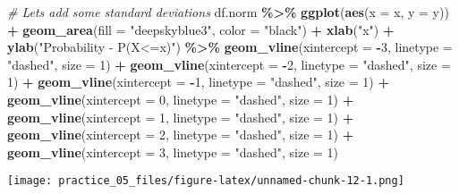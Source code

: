 \documentclass[
]{article}
\newenvironment{Shaded}{\begin{snugshade}}{\end{snugshade}}
\newcommand{\AttributeTok}[1]{\textcolor[rgb]{0.13,0.29,0.53}{#1}}
\newcommand{\CommentTok}[1]{\textcolor[rgb]{0.56,0.35,0.01}{\textit{#1}}}
\newcommand{\DecValTok}[1]{\textcolor[rgb]{0.00,0.00,0.81}{#1}}
\newcommand{\FunctionTok}[1]{\textcolor[rgb]{0.13,0.29,0.53}{\textbf{#1}}}
\newcommand{\NormalTok}[1]{#1}
\newcommand{\SpecialCharTok}[1]{\textcolor[rgb]{0.81,0.36,0.00}{\textbf{#1}}}
\newcommand{\StringTok}[1]{\textcolor[rgb]{0.31,0.60,0.02}{#1}}
\begin{document}
\begin{Shaded}
\begin{Highlighting}[]
\CommentTok{\# Let\textquotesingle{}s add some standard deviations}
\NormalTok{df.norm }\SpecialCharTok{\%\textgreater{}\%} 
  \FunctionTok{ggplot}\NormalTok{(}\FunctionTok{aes}\NormalTok{(}\AttributeTok{x =}\NormalTok{ x,}
             \AttributeTok{y =}\NormalTok{ y)) }\SpecialCharTok{+}
  \FunctionTok{geom\_area}\NormalTok{(}\AttributeTok{fill =} \StringTok{"deepskyblue3"}\NormalTok{, }
            \AttributeTok{color =} \StringTok{"black"}\NormalTok{) }\SpecialCharTok{+}
  \FunctionTok{xlab}\NormalTok{(}\StringTok{"x"}\NormalTok{) }\SpecialCharTok{+}
  \FunctionTok{ylab}\NormalTok{(}\StringTok{"Probability   {-}   P(X\textless{}=x)"}\NormalTok{) }\SpecialCharTok{\%\textgreater{}\%} 
  \FunctionTok{geom\_vline}\NormalTok{(}\AttributeTok{xintercept =} \SpecialCharTok{{-}}\DecValTok{3}\NormalTok{, }\AttributeTok{linetype =} \StringTok{"dashed"}\NormalTok{, }\AttributeTok{size =} \DecValTok{1}\NormalTok{) }\SpecialCharTok{+}
  \FunctionTok{geom\_vline}\NormalTok{(}\AttributeTok{xintercept =} \SpecialCharTok{{-}}\DecValTok{2}\NormalTok{, }\AttributeTok{linetype =} \StringTok{"dashed"}\NormalTok{, }\AttributeTok{size =} \DecValTok{1}\NormalTok{) }\SpecialCharTok{+}
  \FunctionTok{geom\_vline}\NormalTok{(}\AttributeTok{xintercept =} \SpecialCharTok{{-}}\DecValTok{1}\NormalTok{, }\AttributeTok{linetype =} \StringTok{"dashed"}\NormalTok{, }\AttributeTok{size =} \DecValTok{1}\NormalTok{) }\SpecialCharTok{+}
  \FunctionTok{geom\_vline}\NormalTok{(}\AttributeTok{xintercept =} \DecValTok{0}\NormalTok{, }\AttributeTok{linetype =} \StringTok{"dashed"}\NormalTok{, }\AttributeTok{size =} \DecValTok{1}\NormalTok{) }\SpecialCharTok{+}
  \FunctionTok{geom\_vline}\NormalTok{(}\AttributeTok{xintercept =} \DecValTok{1}\NormalTok{, }\AttributeTok{linetype =} \StringTok{"dashed"}\NormalTok{, }\AttributeTok{size =} \DecValTok{1}\NormalTok{) }\SpecialCharTok{+}
  \FunctionTok{geom\_vline}\NormalTok{(}\AttributeTok{xintercept =} \DecValTok{2}\NormalTok{, }\AttributeTok{linetype =} \StringTok{"dashed"}\NormalTok{, }\AttributeTok{size =} \DecValTok{1}\NormalTok{) }\SpecialCharTok{+}
  \FunctionTok{geom\_vline}\NormalTok{(}\AttributeTok{xintercept =} \DecValTok{3}\NormalTok{, }\AttributeTok{linetype =} \StringTok{"dashed"}\NormalTok{, }\AttributeTok{size =} \DecValTok{1}\NormalTok{) }
\end{Highlighting}
\end{Shaded}

\texttt{[image: practice\_05\_files/figure-latex/unnamed-chunk-12-1.png]}
\end{document}
